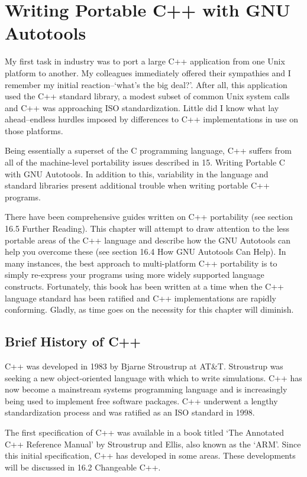 \chapter{Writing Portable C++ with GNU Autotools}\label{Writing_Portable_CPP_with_GNU_Autotools}

My first task in industry was to port a large C++ application from one Unix platform to another. My colleagues immediately offered their sympathies and I remember my initial reaction--`what's the big deal?'. After all, this application used the C++ standard library, a modest subset of common Unix system calls and C++ was approaching ISO standardization. Little did I know what lay ahead--endless hurdles imposed by differences to C++ implementations in use on those platforms.

Being essentially a superset of the C programming language, C++ suffers from all of the machine-level portability issues described in 15. Writing Portable C with GNU Autotools. In addition to this, variability in the language and standard libraries present additional trouble when writing portable C++ programs.

There have been comprehensive guides written on C++ portability (see section 16.5 Further Reading). This chapter will attempt to draw attention to the less portable areas of the C++ language and describe how the GNU Autotools can help you overcome these (see section 16.4 How GNU Autotools Can Help). In many instances, the best approach to multi-platform C++ portability is to simply re-express your programs using more widely supported language constructs. Fortunately, this book has been written at a time when the C++ language standard has been ratified and C++ implementations are rapidly conforming. Gladly, as time goes on the necessity for this chapter will diminish. 

\section{Brief History of C++}

C++ was developed in 1983 by Bjarne Stroustrup at AT\&T. Stroustrup was seeking a new object-oriented language with which to write simulations. C++ has now become a mainstream systems programming language and is increasingly being used to implement free software packages. C++ underwent a lengthy standardization process and was ratified as an ISO standard in 1998.

The first specification of C++ was available in a book titled `The Annotated C++ Reference Manual' by Stroustrup and Ellis, also known as the `ARM'. Since this initial specification, C++ has developed in some areas. These developments will be discussed in 16.2 Changeable C++.

